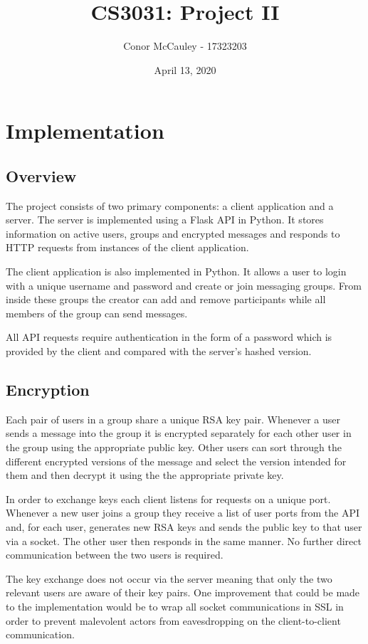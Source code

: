 \documentclass[12pt]{article}
\title{CS3031: Project II}
\author{Conor McCauley - 17323203}
\date{April 13, 2020}
\begin{document}
\maketitle

\section{Implementation}

\subsection{Overview}

\indent The project consists of two primary components: a client application and a server. The server is implemented using a Flask API in Python. It stores information on active users, groups and encrypted messages and responds to HTTP requests from instances of the client application.

\indent The client application is also implemented in Python. It allows a user to login with a unique username and password and create or join messaging groups. From inside these groups the creator can add and remove participants while all members of the group can send messages.

\indent All API requests require authentication in the form of a password which is provided by the client and compared with the server's hashed version.

\subsection{Encryption}

\indent Each pair of users in a group share a unique RSA key pair. Whenever a user sends a message into the group it is encrypted separately for each other user in the group using the appropriate public key. Other users can sort through the different encrypted versions of the message and select the version intended for them and then decrypt it using the the appropriate private key.

\indent In order to exchange keys each client listens for requests on a unique port. Whenever a new user joins a group they receive a list of user ports from the API and, for each user, generates new RSA keys and sends the public key to that user via a socket. The other user then responds in the same manner. No further direct communication between the two users is required.

\indent The key exchange does not occur via the server meaning that only the two relevant users are aware of their key pairs. One improvement that could be made to the implementation would be to wrap all socket communications in SSL in order to prevent malevolent actors from eavesdropping on the client-to-client communication.
\end{document}
